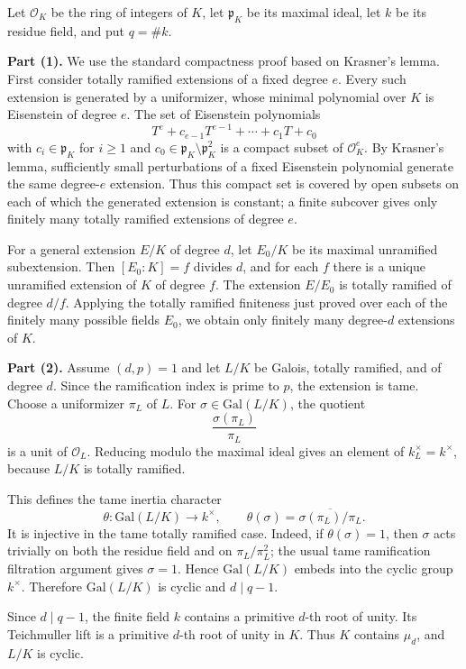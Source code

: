 \begin{solution}
Let $\mathcal{O}_K$ be the ring of integers of $K$, let $\mathfrak p_K$ be its maximal ideal, let $k$ be its residue field, and put $q=\#k$.

\textbf{Part (1).}
We use the standard compactness proof based on Krasner's lemma. First consider totally ramified extensions of a fixed degree $e$. Every such extension is generated by a uniformizer, whose minimal polynomial over $K$ is Eisenstein of degree $e$. The set of Eisenstein polynomials
\[
T^e+c_{e-1}T^{e-1}+\cdots+c_1T+c_0
\]
with $c_i\in \mathfrak p_K$ for $i\geq 1$ and $c_0\in \mathfrak p_K\setminus \mathfrak p_K^2$ is a compact subset of $\mathcal{O}_K^e$. By Krasner's lemma, sufficiently small perturbations of a fixed Eisenstein polynomial generate the same degree-$e$ extension. Thus this compact set is covered by open subsets on each of which the generated extension is constant; a finite subcover gives only finitely many totally ramified extensions of degree $e$.

For a general extension $E/K$ of degree $d$, let $E_0/K$ be its maximal unramified subextension. Then $[E_0:K]=f$ divides $d$, and for each $f$ there is a unique unramified extension of $K$ of degree $f$. The extension $E/E_0$ is totally ramified of degree $d/f$. Applying the totally ramified finiteness just proved over each of the finitely many possible fields $E_0$, we obtain only finitely many degree-$d$ extensions of $K$.

\textbf{Part (2).}
Assume $(d,p)=1$ and let $L/K$ be Galois, totally ramified, and of degree $d$. Since the ramification index is prime to $p$, the extension is tame. Choose a uniformizer $\pi_L$ of $L$. For $\sigma\in \mathrm{Gal}(L/K)$, the quotient
\[
\frac{\sigma(\pi_L)}{\pi_L}
\]
is a unit of $\mathcal{O}_L$. Reducing modulo the maximal ideal gives an element of $k_L^\times=k^\times$, because $L/K$ is totally ramified.

This defines the tame inertia character
\[
\theta:\mathrm{Gal}(L/K)\longrightarrow k^\times,
\qquad
\theta(\sigma)=\overline{\sigma(\pi_L)/\pi_L}.
\]
It is injective in the tame totally ramified case. Indeed, if $\theta(\sigma)=1$, then $\sigma$ acts trivially on both the residue field and on $\pi_L/\pi_L^2$; the usual tame ramification filtration argument gives $\sigma=1$. Hence $\mathrm{Gal}(L/K)$ embeds into the cyclic group $k^\times$. Therefore $\mathrm{Gal}(L/K)$ is cyclic and $d\mid q-1$.

Since $d\mid q-1$, the finite field $k$ contains a primitive $d$-th root of unity. Its Teichmuller lift is a primitive $d$-th root of unity in $K$. Thus $K$ contains $\mu_d$, and $L/K$ is cyclic.


\end{solution}
